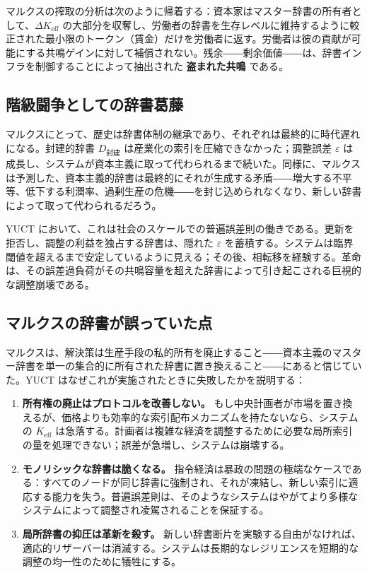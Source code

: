 \documentclass[12pt,a4paper]{article}
\newcommand{\Keff}{K_{\mathrm{eff}}}
\begin{document}
	マルクスの搾取の分析は次のように帰着する：資本家はマスター辞書の所有者として、\(\Delta\Keff\) の大部分を収奪し、労働者の辞書を生存レベルに維持するように較正された最小限のトークン（賃金）だけを労働者に返す。労働者は彼の貢献が可能にする共鳴ゲインに対して補償されない。残余――剰余価値――は、辞書インフラを制御することによって抽出された \textbf{盗まれた共鳴} である。
	
	\subsection{階級闘争としての辞書葛藤}
	
	マルクスにとって、歴史は辞書体制の継承であり、それぞれは最終的に時代遅れになる。封建的辞書 \(D_{\text{封建}}\) は産業化の索引を圧縮できなかった；調整誤差 \(\varepsilon\) は成長し、システムが資本主義に取って代わられるまで続いた。同様に、マルクスは予測した、資本主義的辞書は最終的にそれが生成する矛盾――増大する不平等、低下する利潤率、過剰生産の危機――を封じ込められなくなり、新しい辞書によって取って代わられるだろう。
	
	YUCT において、これは社会のスケールでの普遍誤差則の働きである。更新を拒否し、調整の利益を独占する辞書は、隠れた \(\varepsilon\) を蓄積する。システムは臨界閾値を超えるまで安定しているように見える；その後、相転移を経験する。革命は、その誤差過負荷がその共鳴容量を超えた辞書によって引き起こされる巨視的な調整崩壊である。
	
	\subsection{マルクスの辞書が誤っていた点}
	
	マルクスは、解決策は生産手段の私的所有を廃止すること――資本主義のマスター辞書を単一の集合的に所有された辞書に置き換えること――にあると信じていた。YUCT はなぜこれが実施されたときに失敗したかを説明する：
	
	\begin{enumerate}[leftmargin=*]
		\item \textbf{所有権の廃止はプロトコルを改善しない。} もし中央計画者が市場を置き換えるが、価格よりも効率的な索引配布メカニズムを持たないなら、システムの \(\Keff\) は急落する。計画者は複雑な経済を調整するために必要な局所索引の量を処理できない；誤差が急増し、システムは崩壊する。
		\item \textbf{モノリシックな辞書は脆くなる。} 指令経済は暴政の問題の極端なケースである：すべてのノードが同じ辞書に強制され、それが凍結し、新しい索引に適応する能力を失う。普遍誤差則は、そのようなシステムはやがてより多様なシステムによって調整され凌駕されることを保証する。
		\item \textbf{局所辞書の抑圧は革新を殺す。} 新しい辞書断片を実験する自由がなければ、適応的リザーバーは消滅する。システムは長期的なレジリエンスを短期的な調整の均一性のために犠牲にする。
	\end{enumerate}
	
\end{document}
